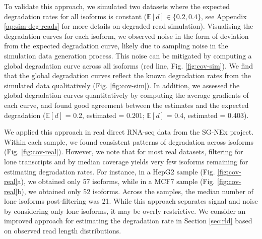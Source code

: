 To validate this approach, we simulated two datasets where the expected degradation rates for all isoforms is constant ($\mathbb{E}[d]\in\{0.2,0.4\}$, see Appendix \ref{ap:sim-deg-reads} for more details on degraded read simulation). Visualising the degradation curves for each isoform, we observed noise in the form of deviation from the expected degradation curve, likely due to sampling noise in the simulation data generation process. This noise can be mitigated by computing a global degradation curve across all isoforms (red line, Fig. \ref{fig:cov-sim}). We find that the global degradation curves reflect the known degradation rates from the simulated data qualitatively (Fig. \ref{fig:cov-sim}). In addition, we assessed the global degradation curves quantitatively by computing the average gradients of each curve, and found good agreement between the estimates and the expected degradation ($\mathbb{E}[d]$ = 0.2, estimated = 0.201; $\mathbb{E}[d]$ = 0.4, estimated = 0.403).

We applied this approach in real direct RNA-seq data from the SG-NEx project. Within each sample, we found consistent patterns of degradation across isoforms (Fig. \ref{fig:cov-real}). However, we note that for most real datasets, filtering for lone transcripts and by median coverage yields very few isoforms remaining for estimating degradation rates. For instance, in a HepG2 sample (Fig. \ref{fig:cov-real}a), we obtained only 57 isoforms, while in a MCF7 sample (Fig. \ref{fig:cov-real}b), we obtained only 52 isoforms. Across the samples, the median number of lone isoforms post-filtering was 21. While this approach separates signal and noise by considering only lone isoforms, it may be overly restrictive. We consider an improved approach for estimating the degradation rate in Section \ref{sec:rld} based on observed read length distributions. 

